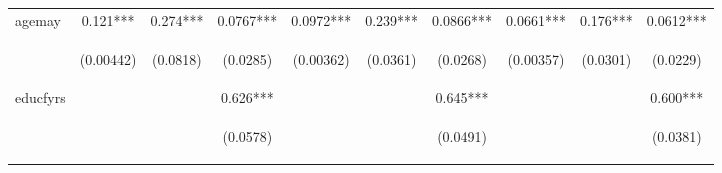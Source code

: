 \documentclass[]{article}
\begin{document}
\begin{center}
\begin{tabular}{lccccccccc}
agemay & 0.121*** & 0.274*** & 0.0767*** & 0.0972*** & 0.239*** & 0.0866*** & 0.0661*** & 0.176*** & 0.0612*** \\
\vspace{4pt} & \begin{footnotesize}(0.00442)\end{footnotesize} & \begin{footnotesize}(0.0818)\end{footnotesize} & \begin{footnotesize}(0.0285)\end{footnotesize} & \begin{footnotesize}(0.00362)\end{footnotesize} & \begin{footnotesize}(0.0361)\end{footnotesize} & \begin{footnotesize}(0.0268)\end{footnotesize} & \begin{footnotesize}(0.00357)\end{footnotesize} & \begin{footnotesize}(0.0301)\end{footnotesize} & \begin{footnotesize}(0.0229)\end{footnotesize} \\
educfyrs &  &  & 0.626*** &  &  & 0.645*** &  &  & 0.600*** \\
\vspace{4pt} & \begin{footnotesize}\end{footnotesize} & \begin{footnotesize}\end{footnotesize} & \begin{footnotesize}(0.0578)\end{footnotesize} & \begin{footnotesize}\end{footnotesize} & \begin{footnotesize}\end{footnotesize} & \begin{footnotesize}(0.0491)\end{footnotesize} & \begin{footnotesize}\end{footnotesize} & \begin{footnotesize}\end{footnotesize} & \begin{footnotesize}(0.0381)\end{footnotesize} \\

\end{tabular}
\end{center}
\end{document}
